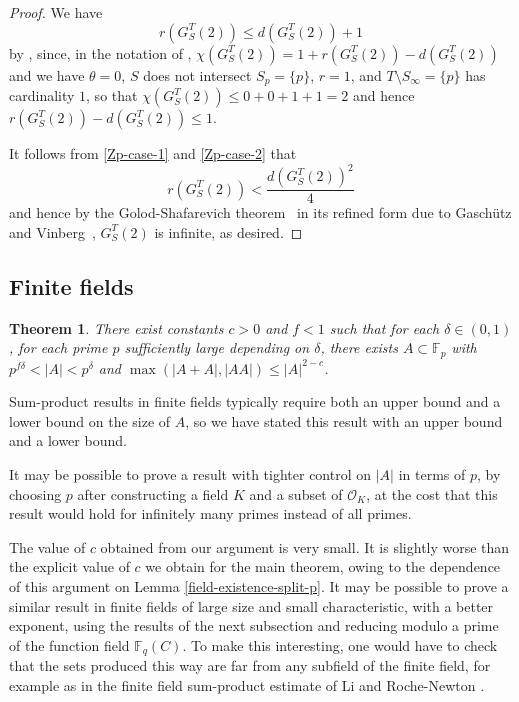 \documentclass{amsart}
\numberwithin{equation}{section}
\newcommand{\abs}[1]{\mathopen{}\left| #1\mathclose{}\right|}
\newtheorem{theorem}{Theorem}[section]
\begin{document}
\begin{proof}
We have
\begin{equation}\label{Zp-case-2} r(G_S^T(2)) \leq  d(G^T_S(2))+1 \end{equation}
by \cite[Theorem 10.7.12]{Neukirch2008}, since, in the notation of \cite{Neukirch2008}, $\chi(G_S^T(2))=1+r(G_S^T(2))-d(G_S^T(2))$ and we have $\theta=0$, $S$ does not intersect $S_p =\{p\}$, $r=1$, and $T \setminus S_\infty= \{p\}$ has cardinality $1$, so that $\chi(G_S^T(2))\leq 0+0+1+1=2$ and hence $r(G_S^T(2))-d(G_S^T(2))\leq 1$.

It follows from \eqref{Zp-case-1} and \eqref{Zp-case-2} that
\[ r(G_S^T(2)) <  \frac{d(G^T_S(2))^2}{4} \]
and hence by the Golod-Shafarevich theorem~\cite{GolodShafarevich} in its refined form due to Gasch\"utz and Vinberg~\cite{Vinberg1965,Koch1969}, $G_S^T(2)$ is infinite, as desired.\end{proof}

\subsection{Finite fields}

\begin{theorem}\label{finite-field-main} There exist constants $c>0$ and $f<1$ such that for each $\delta \in (0,1)$, for each prime $p$ sufficiently large depending on $\delta$, there exists $A \subset \mathbb F_p$ with $p^{f\delta}< \abs{A} < p^{\delta}$ and $\max(\abs{A+A},\abs{AA})\leq \abs{A}^{2-c}$. \end{theorem}

Sum-product results in finite fields typically require both an upper bound and a lower bound on the size of $A$, so we have stated this result with an upper bound and a lower bound.

It may be possible to prove a result with tighter control on $\abs{A}$ in terms of $p$, by choosing $p$ after constructing a field $K$ and a subset of $\mathcal O_K$, at the cost that this result would hold for infinitely many primes instead of all primes.

The value of $c$ obtained from our argument is very small. It is slightly worse than the explicit value of $c$ we obtain for the main theorem, owing to the dependence of this argument on Lemma \ref{field-existence-split-p}. It may be possible to prove a similar result in finite fields of large size and small characteristic, with a better exponent, using the results of the next subsection and reducing modulo a prime of the function field $\mathbb F_q(C)$. To make this interesting, one would have to check that the sets produced this way are far from any subfield of the finite field, for example as in the finite field sum-product estimate of Li and Roche-Newton \cite{Li2011}.
\end{document}
